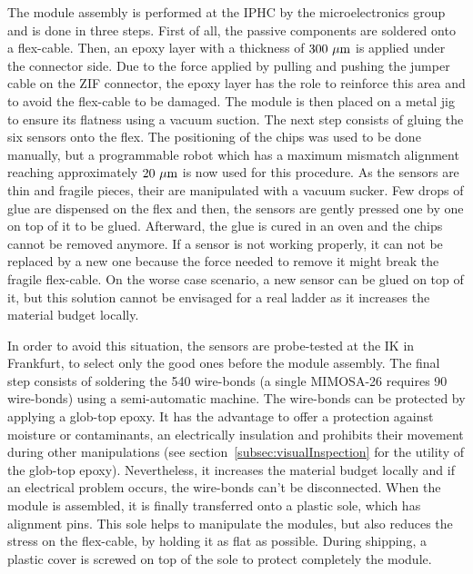     The module assembly is performed at the \gls{IPHC} by the microelectronics group and is done in three steps.
    First of all, the passive components are soldered onto a flex-cable.
    Then, an epoxy layer with a thickness of $300~\rm{\mu m}$ is applied under the connector side.
    Due to the force applied by pulling and pushing the jumper cable on the \gls{ZIF} connector, the epoxy layer has the role to reinforce this area and to avoid the flex-cable to be damaged.
    The module is then placed on a metal jig to ensure its flatness using a vacuum suction.
    The next step consists of gluing the six sensors onto the flex.
    The positioning of the chips was used to be done manually, but a programmable robot which has a maximum mismatch alignment reaching approximately $20~\mu\rm{m}$ is now used for this procedure.
    As the sensors are thin and fragile pieces, their are manipulated with a vacuum sucker.
    Few drops of glue are dispensed on the flex and then, the sensors are gently pressed one by one on top of it to be glued.
    Afterward, the glue is cured in an oven and the chips cannot be removed anymore.
    If a sensor is not working properly, it can not be replaced by a new one because the force needed to remove it might break the fragile flex-cable.
    On the worse case scenario, a new sensor can be glued on top of it, but this solution cannot be envisaged for a real ladder as it increases the material budget locally.
    
    In order to avoid this situation, the sensors are probe-tested at the IK in Frankfurt, to select only the good ones before the module assembly.
    The final step consists of soldering the 540 wire-bonds (a single \gls{MIMOSA}-26 requires 90 wire-bonds) using a semi-automatic machine.
    The wire-bonds can be protected by applying a glob-top epoxy.
    It has the advantage to offer a protection against moisture or contaminants, an electrically insulation and prohibits their movement during other manipulations (see section~\ref{subsec:visualInspection} for the utility of the glob-top epoxy). 
    Nevertheless, it increases the material budget locally and if an electrical problem occurs, the wire-bonds can't be disconnected.
    When the module is assembled, it is finally transferred onto a plastic sole, which has alignment pins.
    This sole helps to manipulate the modules, but also reduces the stress on the flex-cable, by holding it as flat as possible.
    During shipping, a plastic cover is screwed on top of the sole to protect completely the module.

